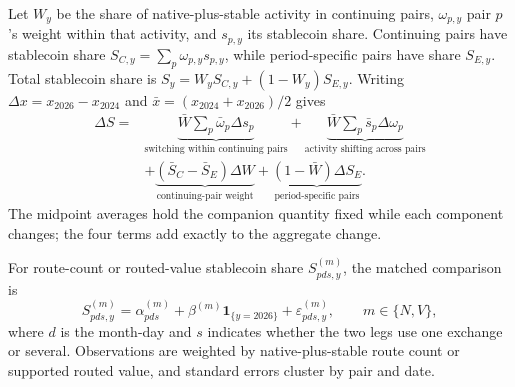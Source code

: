 Let $W_y$ be the share of native-plus-stable activity in continuing pairs, $\omega_{p,y}$ pair $p$'s weight within that activity, and $s_{p,y}$ its stablecoin share. Continuing pairs have stablecoin share $S_{C,y}=\sum_p\omega_{p,y}s_{p,y}$, while period-specific pairs have share $S_{E,y}$. Total stablecoin share is $S_y=W_yS_{C,y}+(1-W_y)S_{E,y}$. Writing $\Delta x=x_{2026}-x_{2024}$ and $\bar{x}=(x_{2024}+x_{2026})/2$ gives
\begin{equation}
\label{eq:pair-decomposition}
\begin{aligned}
\Delta S={}&
\underbrace{\bar{W}\sum_p\bar{\omega}_p\Delta s_p}_{\text{switching within continuing pairs}}
+\underbrace{\bar{W}\sum_p\bar{s}_p\Delta\omega_p}_{\text{activity shifting across pairs}}\\
&+\underbrace{(\bar{S}_C-\bar{S}_E)\Delta W}_{\text{continuing-pair weight}}
+\underbrace{(1-\bar{W})\Delta S_E}_{\text{period-specific pairs}}.
\end{aligned}
\end{equation}
The midpoint averages hold the companion quantity fixed while each component changes; the four terms add exactly to the aggregate change.

For route-count or routed-value stablecoin share $S^{(m)}_{pds,y}$, the matched comparison is
\begin{equation}
\label{eq:pair-fe}
S^{(m)}_{pds,y}=\alpha^{(m)}_{pds}+\beta^{(m)}\mathbf{1}_{\{y=2026\}}+\varepsilon^{(m)}_{pds,y},
\qquad m\in\{N,V\},
\end{equation}
where $d$ is the month-day and $s$ indicates whether the two legs use one exchange or several. Observations are weighted by native-plus-stable route count or supported routed value, and standard errors cluster by pair and date.

\begin{table}[tbp]
\centering
\caption{Stablecoin share among native and stable intermediaries}
\label{tab:app:rotation}
\small

\end{table}

\begin{table}[tbp]
\centering
\caption{USDT intermediary use relative to endpoint demand}
\label{tab:app:usdt-excess-use}
\small

\end{table}

